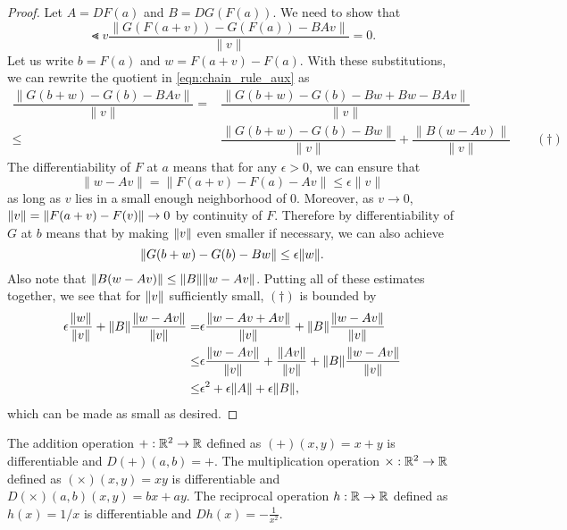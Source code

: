 \documentclass[11pt,a4paper]{article}
\begin{document}
\begin{proof}
Let $A = DF(a)$ and $B = DG(F(a))$. We need to show that 
\begin{equation}\label{eqn:chain_rule_aux}
    \Lt{v} \dfrac{\|G(F(a+v))-G(F(a))-BAv\|}{\|v\|} = 0.
\end{equation}
Let us write $b = F(a)$ and $w = F(a+v)-F(a)$. With these substitutions, we can rewrite the quotient in \eqref{eqn:chain_rule_aux} as 
\begin{align*}
\dfrac{\|G(b+w)-G(b)-BAv\|}{\|v\|} =& 
\dfrac{\|G(b+w)-G(b)-Bw+Bw-BAv\|}{\|v\|} \\
\le& \dfrac{\|G(b+w)-G(b)-Bw\|}{\|v\|} + \dfrac{\|B(w-Av)\|}{\|v\|}\qquad{(\dagger)}
\end{align*}
The differentiability of $F$ at $a$ means that for any $\epsilon>0$, we can ensure that 
\begin{equation*}
\|w-Av\| = \|F(a+v)-F(a)-Av\| \le \epsilon \|v\|
\end{equation*}
as long as $v$ lies in a small enough neighborhood of $0$. Moreover, as $v\rightarrow 0$, $\|v\| = \|F(a+v)-F(v)\|\rightarrow 0$ by continuity of $F$. Therefore by differentiability of $G$ at $b$ means that by making $\|v\|$ even smaller if necessary, we can also achieve 
\begin{equation*}
    \|G(b+w)-G(b)-Bw\| \le \epsilon\|w\|.
\end{equation*}
Also note that $\|B(w-Av)\|\le \|B\|\|w-Av\|$. Putting all of these estimates together, we see that for $\|v\|$ sufficiently small, $(\dagger)$ is bounded by
\begin{align*}
\epsilon \dfrac{\|w\|}{\|v\|} + \|B\|\dfrac{\|w-Av\|}{\|v\|}
=& \epsilon \dfrac{\|w-Av+Av\|}{\|v\|} + \|B\|\dfrac{\|w-Av\|}{\|v\|} \\
\le& \epsilon \dfrac{\|w-Av\|}{\|v\|} + \dfrac{\|Av\|}{\|v\|} + \|B\|\dfrac{\|w-Av\|}{\|v\|} \\
\le& \epsilon^2+\epsilon\|A\|+\epsilon\|B\|,
\end{align*}
which can be made as small as desired.
\end{proof}

\begin{lemma}
The addition operation $+:\mathbb{R}^2\rightarrow \mathbb{R}$ defined as $(+)(x,y) = x+y$ is differentiable and $D(+)(a,b) = +$. The multiplication operation $\times:\mathbb{R}^2\rightarrow \mathbb{R}$ defined as $(\times)(x,y) = xy$ is differentiable and $D(\times)(a,b)(x,y) = bx+ay$. The reciprocal operation $h:\mathbb{R}\rightarrow \mathbb{R}$ defined as $h(x) = 1/x$ is differentiable and $Dh(x) = -\frac{1}{x^2}$.
\end{lemma}
\end{document}
